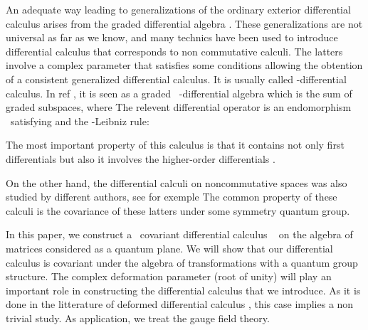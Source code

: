 \documentclass[a4paper,12pt,thmsa]{article}
\begin{document}
An adequate way leading to generalizations of the ordinary exterior
differential calculus arises from the graded differential algebra \myHighlight{$\left[
1-3\right] $}\coordHE{}. These generalizations are not universal as far as we know, and
many technics have been used to introduce differential calculus that
corresponds to non commutative calculi. The latters involve a complex
parameter that satisfies some conditions allowing the obtention of a
consistent generalized differential calculus. It is usually called \coordHE{}%
-differential calculus. In ref \myHighlight{$\left[ 1-3\right] $}\coordHE{} , it is seen
as a graded \ \coordHE{}-differential algebra which is the sum of \coordHE{}graded subspaces, where \coordHE{}
The relevent differential operator is an endomorphism \myHighlight{$d$}\coordHE{} \
satisfying \coordHE{} and the \coordHE{}-Leibniz rule:

\coordHE{}

The most important property of this calculus is that it contains not only
first differentials \coordHE{}  \coordHE{} but also it involves the higher-order
differentials \coordHE{}.

On the other hand, the differential calculi \myHighlight{$(d^2=0)$}\coordHE{} on noncommutative
spaces was also studied by different authors, see for exemple \coordHE{} The
common property of these calculi is the covariance of these latters under
some symmetry quantum group.

In this paper, we construct a \ covariant differential calculus \ \coordHE{} on
the algebra \myHighlight{$M$}\coordHE{} of \coordHE{} matrices considered as a quantum plane. We
will show that our differential calculus is covariant under the algebra of
transformations with a quantum group structure. The complex deformation
parameter \myHighlight{$q$}\coordHE{} (\myHighlight{$3^{rd}-$}\coordHE{}root of unity) will play an important role in
constructing the differential calculus that we introduce. As it is done in
the litterature of deformed differential calculus \myHighlight{$\left[ 4,5\right] $}\coordHE{}, this
case implies a non trivial study. As application, we treat the gauge field
theory.
\end{document}
